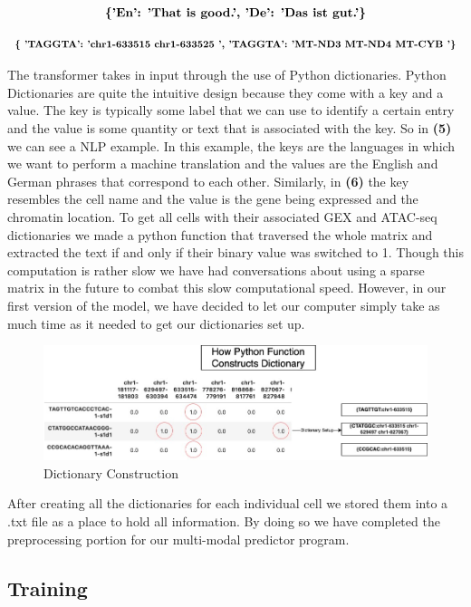 \begin{equation}
\textbf{\{{\text{'En': 'That is good.'}}, {{\text{'De': 'Das ist gut.'}}\}}}
\end{equation}

\begin{equation}
\textbf{\{ \text{'TAGGTA': 'chr1-633515 chr1-633525 '},  \text{'TAGGTA': 'MT-ND3 MT-ND4 MT-CYB '}\}}
\end{equation}

The transformer takes in input through the use of Python dictionaries. Python Dictionaries are quite the intuitive design because they come with a key and a value. The key is typically some label that we can use to identify a certain entry and the value is some quantity or text that is associated with the key. So in \textbf{(5)} we can see a NLP example. In this example, the keys are the languages in which we want to perform a machine translation and the values are the English and German phrases that correspond to each other. Similarly, in \textbf{(6)} the key resembles the cell name and the value is the gene being expressed and the chromatin location. To get all cells with their associated GEX and ATAC-seq dictionaries we made a python function that traversed the whole matrix and extracted the text if and only if their binary value was switched to 1. Though this computation is rather slow we have had conversations about using a sparse matrix in the future to combat this slow computational speed. However, in our first version of the model, we have decided to let our computer simply take as much time as it needed to get our dictionaries set up. 

\begin{figure}[H]
\centering
\includegraphics[width=.85\textwidth]{figures/pyfunc.jpg}
\caption{Dictionary Construction}
\end{figure}

\noindent
After creating all the dictionaries for each individual cell we stored them into a .txt file as a place to hold all information. By doing so we have completed the preprocessing portion for our multi-modal predictor program.

\subsection{Training}

